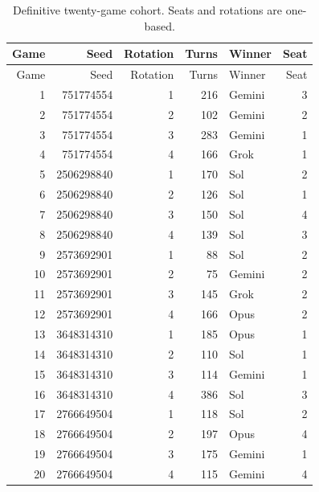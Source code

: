 \begin{longtable}{rrrrlr}
\caption{Definitive twenty-game cohort. Seats and rotations are one-based.}\label{tab:cohort-full}\\
\toprule Game & Seed & Rotation & Turns & Winner & Seat\\\midrule\endfirsthead
\toprule Game & Seed & Rotation & Turns & Winner & Seat\\\midrule\endhead
1 & 751774554 & 1 & 216 & Gemini & 3 \\
2 & 751774554 & 2 & 102 & Gemini & 2 \\
3 & 751774554 & 3 & 283 & Gemini & 1 \\
4 & 751774554 & 4 & 166 & Grok & 1 \\
5 & 2506298840 & 1 & 170 & Sol & 2 \\
6 & 2506298840 & 2 & 126 & Sol & 1 \\
7 & 2506298840 & 3 & 150 & Sol & 4 \\
8 & 2506298840 & 4 & 139 & Sol & 3 \\
9 & 2573692901 & 1 & 88 & Sol & 2 \\
10 & 2573692901 & 2 & 75 & Gemini & 2 \\
11 & 2573692901 & 3 & 145 & Grok & 2 \\
12 & 2573692901 & 4 & 166 & Opus & 2 \\
13 & 3648314310 & 1 & 185 & Opus & 1 \\
14 & 3648314310 & 2 & 110 & Sol & 1 \\
15 & 3648314310 & 3 & 114 & Gemini & 1 \\
16 & 3648314310 & 4 & 386 & Sol & 3 \\
17 & 2766649504 & 1 & 118 & Sol & 2 \\
18 & 2766649504 & 2 & 197 & Opus & 4 \\
19 & 2766649504 & 3 & 175 & Gemini & 1 \\
20 & 2766649504 & 4 & 115 & Gemini & 4 \\
\bottomrule\end{longtable}
